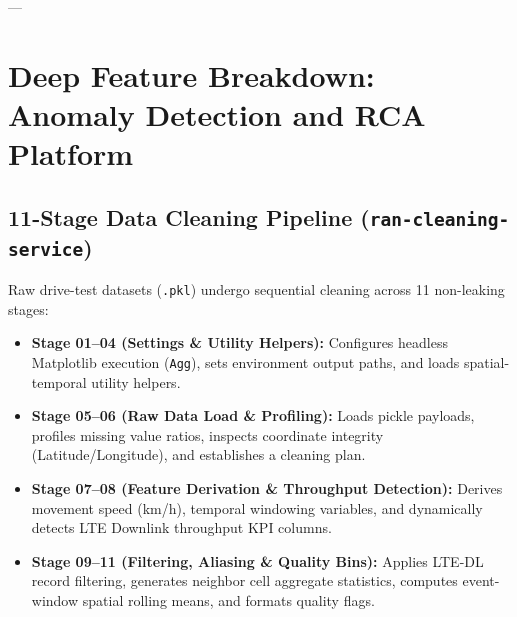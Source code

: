 \documentclass[12pt,a4paper]{report}
\begin{document}
---

\section{Deep Feature Breakdown: Anomaly Detection and RCA Platform}

\subsection{11-Stage Data Cleaning Pipeline (\texttt{ran-cleaning-service})}
Raw drive-test datasets (\texttt{.pkl}) undergo sequential cleaning across 11 non-leaking stages:
\begin{itemize}
    \item \textbf{Stage 01--04 (Settings \& Utility Helpers):} Configures headless Matplotlib execution (\texttt{Agg}), sets environment output paths, and loads spatial-temporal utility helpers.
    \item \textbf{Stage 05--06 (Raw Data Load \& Profiling):} Loads pickle payloads, profiles missing value ratios, inspects coordinate integrity (Latitude/Longitude), and establishes a cleaning plan.
    \item \textbf{Stage 07--08 (Feature Derivation \& Throughput Detection):} Derives movement speed (km/h), temporal windowing variables, and dynamically detects LTE Downlink throughput KPI columns.
    \item \textbf{Stage 09--11 (Filtering, Aliasing \& Quality Bins):} Applies LTE-DL record filtering, generates neighbor cell aggregate statistics, computes event-window spatial rolling means, and formats quality flags.
\end{itemize}
\end{document}
